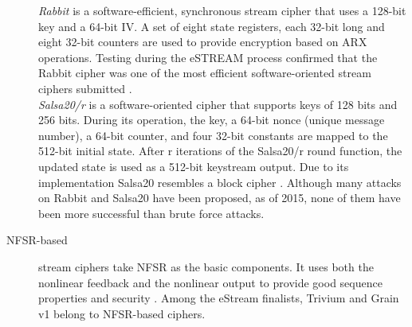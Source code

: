 \begin{description}
		\emph{Rabbit} is a software-efficient, synchronous stream cipher that uses a 128-bit key and a 64-bit IV. A set of eight state registers, each 32-bit long and eight 32-bit counters are used to provide encryption based on ARX operations. Testing during the eSTREAM process confirmed that the Rabbit cipher was one of the most efficient software-oriented stream ciphers submitted \cite{boesgaard2008rabbit}.\\
		\emph{Salsa20/r} is a software-oriented cipher that supports keys of 128 bits and 256 bits. During its operation, the key, a 64-bit nonce (unique message number), a 64-bit counter, and four 32-bit constants are mapped to the 512-bit initial state. After r iterations of the Salsa20/r round function, the updated state is used as a 512-bit keystream output. Due to its implementation Salsa20 resembles a block cipher \cite{bernstein2008salsa20}.
		Although many attacks on Rabbit and Salsa20 have been proposed, as of 2015, none of them have been more successful than brute force attacks. 
		\item [NFSR-based] stream ciphers take NFSR as the basic components. It uses both the nonlinear feedback and the nonlinear output to provide good sequence properties and security \cite{jiao2020stream}. 
		Among the eStream finalists, Trivium and Grain v1 belong to NFSR-based ciphers.
		
		\begin{figure}[h]
			

\end{figure}
\end{description}
